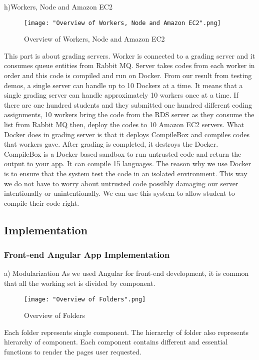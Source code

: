 \documentclass[10pt,journal,compsoc]{IEEEtran}
\begin{document}
\null\qquad 	h)Workers, Node and Amazon EC2
\begin{figure}[H]
\centering
\texttt{[image: "Overview of Workers, Node and Amazon EC2".png]}
{\caption*{Overview of Workers, Node and Amazon EC2}}
\end{figure}
This part is about grading servers. Worker is connected to a grading server and it consumes queue entities from Rabbit MQ. Server takes codes from each worker in order and this code is compiled and run on Docker. From our result from testing demos, a single server can handle up to 10 Dockers at a time. It means that a single grading server can handle approximately 10 workers once at a time. If there are one hundred students and they submitted one hundred different coding assignments, 10 workers bring the code from the RDS server as they consume the list from Rabbit MQ then, deploy the codes to 10 Amazon EC2 servers. What Docker does in grading server is that it deploys CompileBox and compiles codes that workers gave. After grading is completed, it destroys the Docker. CompileBox is a Docker based sandbox to run untrusted code and return the output to your app. It can compile 15 languages. The reason why we use Docker is to ensure that the system test the code in an isolated environment. This way we do not have to worry about untrusted code possibly damaging our server intentionally or unintentionally. We can use this system to allow student to compile their code right.

\subsection{Implementation}
\subsubsection{Front-end Angular App Implementation}
\null\qquad a) Modularization
As we used Angular for front-end development, it is common that all the working set is divided by component.


\begin{figure}[H]
\centering
\texttt{[image: "Overview of Folders".png]}
{\caption*{Overview of Folders}}
\end{figure}
Each folder represents single component. The hierarchy of folder also represents hierarchy of component. Each component contains different and essential functions to render the pages user requested.
\end{document}
